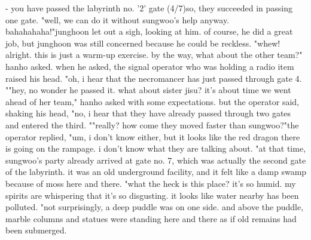 - you have passed the labyrinth no.
 '2' gate (4/7)so, they succeeded in passing one gate.
"well, we can do it without sungwoo's help anyway.
 bahahahaha!"junghoon let out a sigh, looking at him.
 of course, he did a great job, but junghoon was still concerned because he could be reckless.
"whew! alright.
 this is just a warm-up exercise.
 by the way, what about the other team?" hanho asked.
when he asked, the signal operator who was holding a radio item raised his head.
"oh, i hear that the necromancer has just passed through gate 4.
""hey, no wonder he passed it.
 what about sister jisu? it's about time we went ahead of her team," hanho asked with some expectations.
but the operator said, shaking his head, "no, i hear that they have already passed through two gates and entered the third.
""really? how come they moved faster than sungwoo?"the operator replied, "um, i don't know either, but it looks like the red dragon there is going on the rampage.
 i don't know what they are talking about.
"at that time, sungwoo's party already arrived at gate no.
 7, which was actually the second gate of the labyrinth.
it was an old underground facility, and it felt like a damp swamp because of moss here and there.
"what the heck is this place? it's so humid.
 my spirits are whispering that it's so disgusting.
 it looks like water nearby has been polluted.
"not surprisingly, a deep puddle was on one side.
 and above the puddle, marble columns and statues were standing here and there as if old remains had been submerged.

